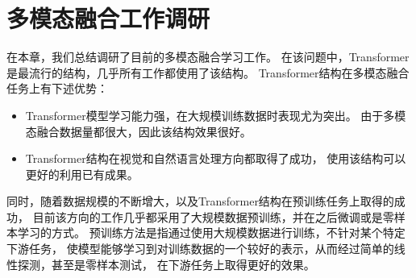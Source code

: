 \chapter{多模态融合工作调研}\label{chap:survey}

在本章，我们总结调研了目前的多模态融合学习工作。
在该问题中，Transformer是最流行的结构，几乎所有工作都使用了该结构。
Transformer结构在多模态融合任务上有下述优势：

\begin{itemize}
    \item Transformer模型学习能力强，在大规模训练数据时表现尤为突出。
    由于多模态融合数据量都很大，因此该结构效果很好。
    \item Transformer结构在视觉和自然语言处理方向都取得了成功，
    使用该结构可以更好的利用已有成果。
\end{itemize}

同时，随着数据规模的不断增大，以及Transformer结构在预训练任务上取得的成功，
目前该方向的工作几乎都采用了大规模数据预训练，并在之后微调或是零样本学习的方式。
预训练方法是指通过使用大规模数据进行训练，不针对某个特定下游任务，
使模型能够学习到对训练数据的一个较好的表示，从而经过简单的线性探测，甚至是零样本测试，
在下游任务上取得更好的效果。

